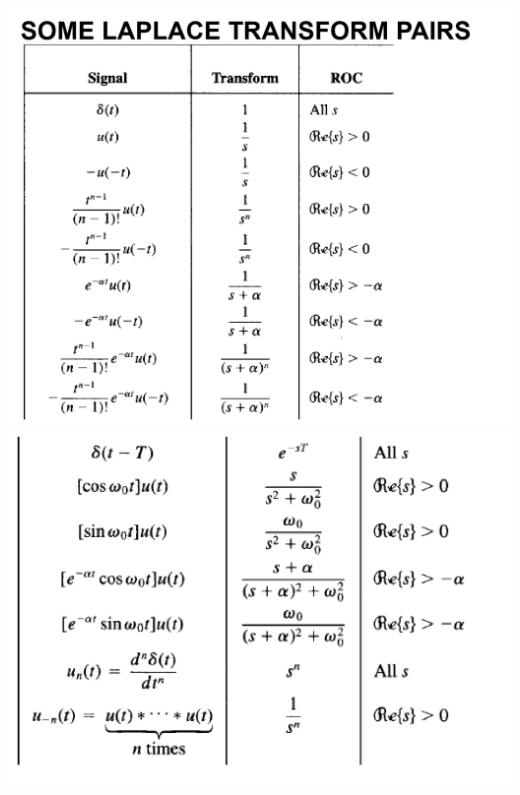 \documentclass[landscape,a4paper]{article}
\begin{document}
\begin{multicols}{2}
\includegraphics[width=0.9\linewidth]{p2.png}
\includegraphics[width=0.9\linewidth]{p3.png}
\end{multicols}
\end{document}
